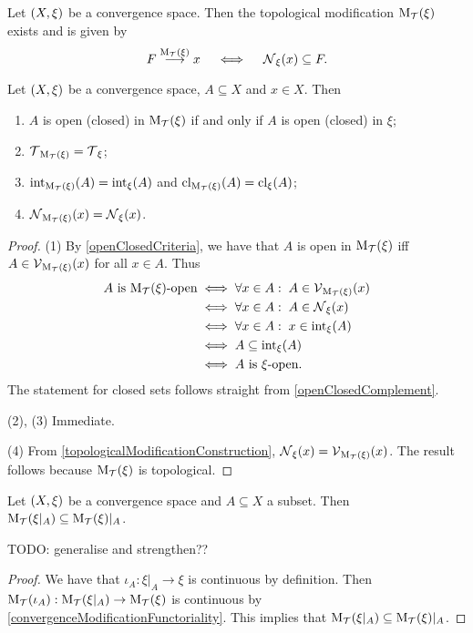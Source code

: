 \begin{proposition} \label{topologicalModificationConstruction}
Let $\sSet{X,\xi}$ be a convergence space. Then the topological modification $\operatorname{M_\mathcal{T}}(\xi)$ exists and is given by
\[ F \overset{\operatorname{M_\mathcal{T}}(\xi)}{\longrightarrow} x \quad\iff\quad \operatorname{\mathcal{N}}_\xi(x) \subseteq F. \]
\end{proposition}

\begin{proposition} \label{topologicalModificationPreservation}
Let $\sSet{X,\xi}$ be a convergence space, $A\subseteq X$ and $x\in X$. Then
\begin{enumerate}
\item $A$ is open (closed) in $\operatorname{M_\mathcal{T}}(\xi)$ \textup{if and only if} $A$ is open (closed) in $\xi$;
\item $\operatorname{\mathcal{T}}_{\operatorname{M_\mathcal{T}}(\xi)} = \operatorname{\mathcal{T}}_\xi$;
\item $\operatorname{int}_{\operatorname{M_\mathcal{T}}(\xi)}(A) = \operatorname{int}_{\xi}(A)$ and $\operatorname{cl}_{\operatorname{M_\mathcal{T}}(\xi)}(A) = \operatorname{cl}_{\xi}(A)$;
\item $\operatorname{\mathcal{N}}_{\operatorname{M_\mathcal{T}}(\xi)}(x) = \operatorname{\mathcal{N}}_\xi(x)$.
\end{enumerate}
\end{proposition}
\begin{proof}
(1) By \ref{openClosedCriteria}, we have that $A$ is open in $\operatorname{M_\mathcal{T}}(\xi)$ iff $A\in \operatorname{\mathcal{V}}_{\operatorname{M_\mathcal{T}}(\xi)}(x)$ for all $x\in A$. Thus
\begin{align*}
\text{$A$ is $\operatorname{M_\mathcal{T}}(\xi)$-open} &\iff \forall x\in A: \; A\in \operatorname{\mathcal{V}}_{\operatorname{M_\mathcal{T}}(\xi)}(x) \\
&\iff \forall x\in A: \; A\in \operatorname{\mathcal{N}}_\xi(x) \\
&\iff \forall x\in A: \; x\in \operatorname{int}_\xi(A) \\
&\iff A\subseteq \operatorname{int}_\xi(A) \\
&\iff \text{$A$ is $\xi$-open}.
\end{align*}
The statement for closed sets follows straight from \ref{openClosedComplement}.

(2), (3) Immediate.

(4) From \ref{topologicalModificationConstruction}, $\operatorname{\mathcal{N}}_\xi(x) = \operatorname{\mathcal{V}}_{\operatorname{M_\mathcal{T}}(\xi)}(x)$. The result follows because $\operatorname{M_\mathcal{T}}(\xi)$ is topological.
\end{proof}


\begin{lemma} \label{subspaceTopologicalModificationInclusion}
Let $\sSet{X,\xi}$ be a convergence space and $A\subseteq X$ a subset. Then $\operatorname{M_\mathcal{T}}(\xi|_A)\subseteq \operatorname{M_\mathcal{T}}(\xi)|_A$.
\end{lemma}
TODO: generalise and strengthen??
\begin{proof}
We have that $\iota_A: \xi|_A \to \xi$ is continuous by definition. Then $\operatorname{M_\mathcal{T}}(\iota_A): \operatorname{M_\mathcal{T}}(\xi|_A) \to \operatorname{M_\mathcal{T}}(\xi)$ is continuous by \ref{convergenceModificationFunctoriality}. This implies that $\operatorname{M_\mathcal{T}}(\xi|_A) \subseteq \operatorname{M_\mathcal{T}}(\xi)|_A$.
\end{proof}

